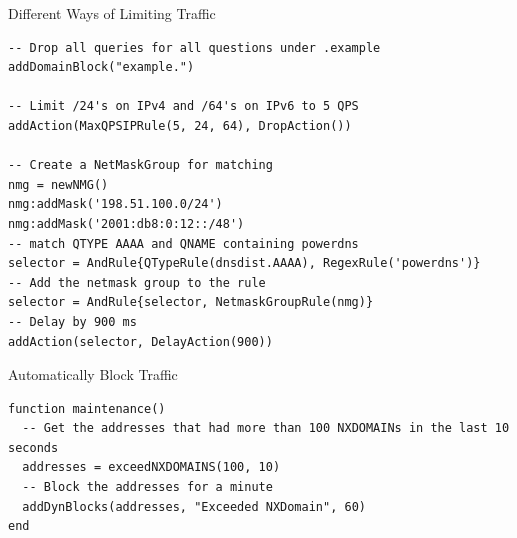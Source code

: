 \documentclass{beamer}
\begin{document}
\begin{frame}[fragile]{Different Ways of Limiting Traffic}
  \begin{verbatim}
-- Drop all queries for all questions under .example
addDomainBlock("example.")

-- Limit /24's on IPv4 and /64's on IPv6 to 5 QPS
addAction(MaxQPSIPRule(5, 24, 64), DropAction())

-- Create a NetMaskGroup for matching
nmg = newNMG()
nmg:addMask('198.51.100.0/24')
nmg:addMask('2001:db8:0:12::/48')
-- match QTYPE AAAA and QNAME containing powerdns
selector = AndRule{QTypeRule(dnsdist.AAAA), RegexRule('powerdns')}
-- Add the netmask group to the rule
selector = AndRule{selector, NetmaskGroupRule(nmg)}
-- Delay by 900 ms
addAction(selector, DelayAction(900))
  \end{verbatim}
\end{frame}

\begin{frame}[fragile]{Automatically Block Traffic}
  \begin{verbatim}
function maintenance()
  -- Get the addresses that had more than 100 NXDOMAINs in the last 10 seconds
  addresses = exceedNXDOMAINS(100, 10)
  -- Block the addresses for a minute
  addDynBlocks(addresses, "Exceeded NXDomain", 60)
end
  \end{verbatim}
\end{frame}
\end{document}
